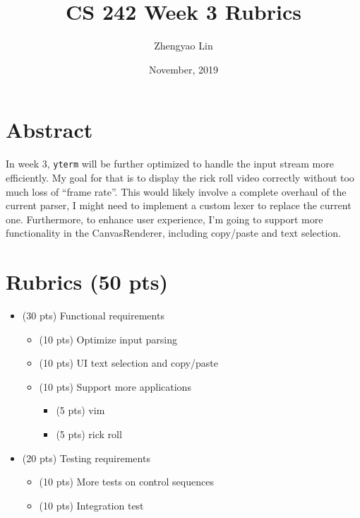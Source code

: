 \documentclass[11pt]{article}
\begin{document}
    \title{CS 242 Week 3 Rubrics}
    \author{Zhengyao Lin}
    \date{November, 2019}
    \maketitle
    
    \section{Abstract}
        In week 3, \texttt{yterm} will be further optimized to handle the input stream more efficiently. My goal for that is to display the rick roll video correctly without too much loss of ``frame rate''. This would likely involve a complete overhaul of the current parser, I might need to implement a custom lexer to replace the current one. Furthermore, to enhance user experience, I'm going to support more functionality in the CanvasRenderer, including copy/paste and text selection.
    
    \section{Rubrics (50 pts)}
        \begin{itemize}
            \item (30 pts) Functional requirements
            \begin{itemize}
                \item (10 pts) Optimize input parsing
                \item (10 pts) UI text selection and copy/paste
                \item (10 pts) Support more applications
                \begin{itemize}
                    \item (5 pts) vim
                    \item (5 pts) rick roll
                \end{itemize}
            \end{itemize}
        
            \item (20 pts) Testing requirements
            \begin{itemize}
                \item (10 pts) More tests on control sequences
                \item (10 pts) Integration test
            \end{itemize}
        \end{itemize}
\end{document}
